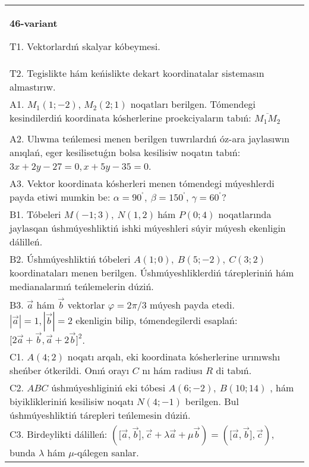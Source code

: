 \documentclass{article}
\begin{document}
\begin{tabular}{m{17cm}}
\textbf{46-variant}
\newline

T1. 
Vektorlardıń skalyar kóbeymesi.
 \\
T2. Tegislikte hám keńislikte dekart koordinatalar sistemasın almastırıw. 
 \\
A1. $M_1(1; -2)$, $M_2(2; 1)$ noqatları berilgen. 
Tómendegi kesindilerdiń koordinata kósherlerine proekciyaların tabıń: $\overline{M_1M_2}$ \\
 \\
A2. 
Ulıwma teńlemesi menen berilgen tuwrılardıń      
óz-ara jaylasıwın anıqlań, eger kesilisetuǵın bolsa kesilisiw noqatın 
tabıń: $3x+2y-27=0, x+5y-35=0$.
 \\
A3. 
Vektor koordinata kósherleri menen tómendegi múyeshlerdi payda etiwi
mumkin be: $\alpha = 90^{{^\circ}},\ \beta = 150^{{^\circ}}$,
$\gamma = 60^{{^\circ}}?$ 
 \\
B1. 
Tóbeleri \(M(-1;3),\ N(1,2)\ \)hám \(P(0;4)\)
noqatlarında jaylasqan úshmúyeshliktiń ishki múyeshleri súyir múyesh
ekenligin dálilleń.
 \\
B2. 
Úshmúyeshliktiń tóbeleri \(A(1;0),\ B(5;-2),\ C(3;2)\)
koordinataları menen berilgen. Úshmúyeshliklerdiń tárepleriniń hám
medianalarınıń teńlemelerin dúziń.
 \\
B3. 
$\vec{a}$ hám $\vec{b}$ vektorlar $\varphi = 2\pi/3$ múyesh payda etedi. $|\vec{a}| = 1,|\vec{b}| = 2$ ekenligin bilip, tómendegilerdi esaplań: 
$\lbrack 2\overrightarrow{a} + \overrightarrow{b},\overrightarrow{a} + 2\overrightarrow{b}\rbrack^{2}$.
 \\
C1. \(A(4;2)\) noqatı arqalı, eki koordinata kósherlerine
urınıwshı sheńber ótkerildi. Onıń orayı $C$ nı hám radiusı
$R$ di tabıń.
 \\
C2. 
$ABC$ úshmúyeshliginiń eki tóbesi
\(A(6; - 2),\ B(10;14)\) , hám biyiklikleriniń kesilisiw noqatı
\(N(4; - 1)\) berilgen. Bul úshmúyeshliktiń tárepleri teńlemesin dúziń.
 \\
C3. 
Birdeylikti dálilleń: \((\lbrack\vec{a},\vec{b}\rbrack,\vec{c} + \lambda\vec{a} + \mu\vec{b}) = (\lbrack\vec{a},\vec{b}\rbrack,\vec{c})\), bunda \(\lambda\) hám \(\mu\)-qálegen sanlar.
 \\

\end{tabular}
\vspace{1cm}
\end{document}

